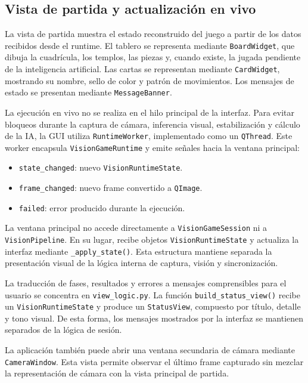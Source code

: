 \subsection{Vista de partida y actualización en vivo}
\label{subsec:vista-partida-gui}

La vista de partida muestra el estado reconstruido del juego a partir de los datos recibidos desde el runtime. El tablero se representa mediante \texttt{BoardWidget}, que dibuja la cuadrícula, los templos, las piezas y, cuando existe, la jugada pendiente de la inteligencia artificial. Las cartas se representan mediante \texttt{CardWidget}, mostrando su nombre, sello de color y patrón de movimientos. Los mensajes de estado se presentan mediante \texttt{MessageBanner}.

La ejecución en vivo no se realiza en el hilo principal de la interfaz. Para evitar bloqueos durante la captura de cámara, inferencia visual, estabilización y cálculo de la IA, la GUI utiliza \texttt{RuntimeWorker}, implementado como un \texttt{QThread}. Este worker encapsula \texttt{VisionGameRuntime} y emite señales hacia la ventana principal:

\begin{itemize}
    \item \texttt{state\_changed}: nuevo \texttt{VisionRuntimeState}.
    \item \texttt{frame\_changed}: nuevo frame convertido a \texttt{QImage}.
    \item \texttt{failed}: error producido durante la ejecución.
\end{itemize}

La ventana principal no accede directamente a \texttt{VisionGameSession} ni a \texttt{VisionPipeline}. En su lugar, recibe objetos \texttt{VisionRuntimeState} y actualiza la interfaz mediante \texttt{\_apply\_state()}. Esta estructura mantiene separada la presentación visual de la lógica interna de captura, visión y sincronización.

La traducción de fases, resultados y errores a mensajes comprensibles para el usuario se concentra en \texttt{view\_logic.py}. La función \texttt{build\_status\_view()} recibe un \texttt{VisionRuntimeState} y produce un \texttt{StatusView}, compuesto por título, detalle y tono visual. De esta forma, los mensajes mostrados por la interfaz se mantienen separados de la lógica de sesión.

La aplicación también puede abrir una ventana secundaria de cámara mediante \texttt{CameraWindow}. Esta vista permite observar el último frame capturado sin mezclar la representación de cámara con la vista principal de partida.

